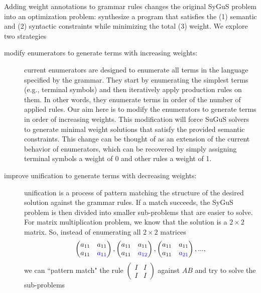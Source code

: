 Adding weight annotations to grammar rules changes the original SyGuS problem into an optimization problem:
%
synthesize a program that satisfies the (1) semantic and (2) syntactic constraints while minimizing the total (3) weight.
%
%
We explore two strategies
%
\begin{description}
\item[modify enumerators to generate terms with increasing weights:]
%
current enumerators are designed to enumerate all terms in the language specified by the grammar.
%
They start by enumerating the simplest terms (e.g., terminal symbols) and then iteratively apply production rules on them.
%
In other words, they enumerate terms in order of the number of applied rules.
%
Our aim here is to modify the enumerators to generate terms in order of increasing weights.
%
This modification will force SuGuS solvers to generate minimal weight solutions that satisfy the provided semantic constraints.
%
This change can be thought of as an extension of the current behavior of enumerators,
%
which can be recovered by simply assigning terminal symbols a weight of 0 and other rules a weight of 1.
%
\item[improve unification to generate terms with decreasing weights:]
%
unification is a process of pattern matching the structure of the desired solution against the grammar rules.
%
If a match succeeds, the SyGuS problem is then divided into smaller sub-problems that are easier to solve.
%
For matrix multiplication problem, we know that the solution is a $2 \times 2$ matrix. So, instead of enumerating all $2 \times 2$ matrices
%
\begin{equation}
\begin{pmatrix} a_{11} & a_{11} \\ a_{11} & \textcolor{blue}{a_{11}} \end{pmatrix},
\begin{pmatrix} a_{11} & a_{11} \\ a_{11} & \textcolor{blue}{a_{12}} \end{pmatrix},
\begin{pmatrix} a_{11} & a_{11} \\ a_{11} & \textcolor{blue}{a_{21}} \end{pmatrix},
...,
\label{eq:sequence-matrices}
\end{equation}
%
we can ``pattern match" the rule $\begin{pmatrix} I & I \\ I & I \end{pmatrix}$ against $AB$ and try to solve the sub-problems

\end{description}
